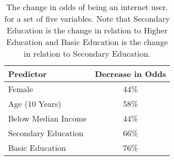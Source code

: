 \documentclass[12pt]{article}
\theoremstyle{definition}
\theoremstyle{algodesc}
\numberwithin{equation}{section}
\begin{document}
\begin{table}[h]
\centering
\begin{tabular}{lc}
\toprule
\textbf{Predictor} & \textbf{Decrease in Odds} \\ \midrule
Female    &   44\%    \\ 
Age (10 Years)   & 58\%       \\ 
Below Median Income    & 44\% \\
Secondary Education    & 66\%  \\
Basic Education  & 76\% \\
\bottomrule                                      
\end{tabular}
\caption{The change in odds of being an internet user. for a set of five variables. Note that Secondary Education is the change in relation to Higher Education and Basic Education is the change in relation to Secondary Education. }
\label{tab:predictors}
\end{table}

\vspace{16cm}
\end{document}
